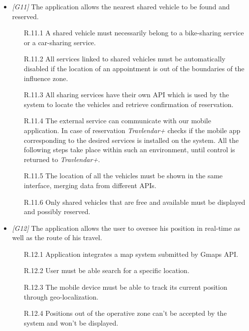 \begin{itemize}
\begin{itemize}
		\end{itemize}


	\item \textit{[G11]} The application allows the nearest shared vehicle to be found and reserved.
		\begin{itemize}
			\item [R.11.1] A shared vehicle must necessarily belong to a bike-sharing service or a car-sharing service.
			\item [R.11.2] All services linked to shared vehicles must be automatically disabled if the location of an appointment is out of the boundaries of the influence zone.
			\item [R.11.3] All sharing services have their own API which is used by the system to locate the vehicles and retrieve confirmation of reservation.
			\item [R.11.4] The external service can communicate with our mobile application. In case of reservation \textit{Travlendar+} checks if the mobile app corresponding to the desired services is installed on the system. All the following steps take place within such an environment, until control is returned to \textit{Travlendar+}.
			\item [R.11.5] The location of all the vehicles must be shown in the same interface, merging data from different APIs.
			\item[R.11.6] Only shared vehicles that are free and available must be displayed and possibly reserved.
		\end{itemize}


	\item \textit{[G12]} The application allows the user to oversee his position in real-time as well as the route of his travel.
		\begin{itemize}
			\item [R.12.1] Application integrates a map system submitted by Gmaps API.
			\item [R.12.2] User must be able search for a specific location.
			\item [R.12.3] The mobile device must be able to track its current position through geo-localization.
			\item [R.12.4] Positions out of the operative zone can't be accepted by the system and won't be displayed.
		\end{itemize}



\end{itemize}
